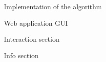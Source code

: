 \documentclass[9pt]{extarticle}
\begin{document}
\begin{section}{Implementation of the algorithm}
\begin{subsection}{Web application GUI}

            \begin{subsubsection}{Interaction section}
                \label{subsec:interaction}



            \end{subsubsection}

            \begin{subsubsection}{Info section}
                

\end{subsubsection}
\end{subsection}
\end{section}
\end{document}
